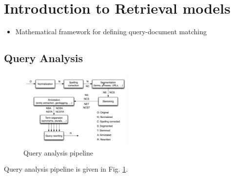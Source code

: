 \section{Introduction to Retrieval models}
\begin{itemize}
	\item Mathematical framework for defining query-document matching
\end{itemize}
\subsection{Query Analysis}
\begin{figure}[h!]
	\centering
	\includegraphics[width=0.5\textwidth]{figures/query_analysis_pipeline.png}
	\caption{Query analysis pipeline}
	\label{img:query_analysis_pipeline}
\end{figure}
Query analysis pipeline is given in Fig. \ref{img:query_analysis_pipeline}.
